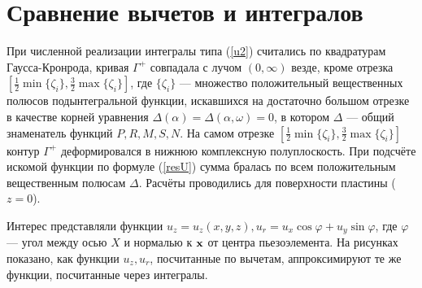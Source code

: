 \documentclass[a4paper, 12pt]{article}
\begin{document}
\section{Сравнение вычетов и интегралов}
При численной реализации интегралы типа (\ref{u2}) считались по квадратурам Гаусса-Кронрода,
кривая $\Gamma^+$ совпадала с лучом $(0,\infty)$ везде, кроме отрезка $[\frac{1}{2} \min \{\zeta_i\}, \frac{3}{2} \max \{\zeta_i\}]$,
где $\{\zeta_i \}$ --- множество положительный вещественных полюсов подынтегральной функции,
искавшихся на достаточно большом отрезке в качестве корней уравнения $\Delta(\alpha)=\Delta(\alpha,\omega)=0$, в котором $\Delta$ --- общий знаменатель функций $P,R,M,S,N$.
На самом отрезке $[\frac{1}{2} \min \{\zeta_i\}, \frac{3}{2} \max \{\zeta_i\}]$ контур $\Gamma^+$ деформировался в нижнюю комплексную полуплоскость.
При подсчёте искомой функции по формуле (\ref{resU}) сумма бралась по всем положительным вещественным полюсам $\Delta$.
Расчёты проводились для поверхности пластины ($z=0$).

Интерес представляли функции $u_z=u_z(x,y,z), u_r= u_x \cos \varphi + u_y \sin \varphi$,
где $\varphi$ --- угол между осью $X$ и нормалью к ${\bf x}$ от центра пьезоэлемента.
На рисунках показано, как функции $u_z, u_r$, посчитанные по вычетам, аппроксимируют те же функции, посчитанные через интегралы.
\end{document}
